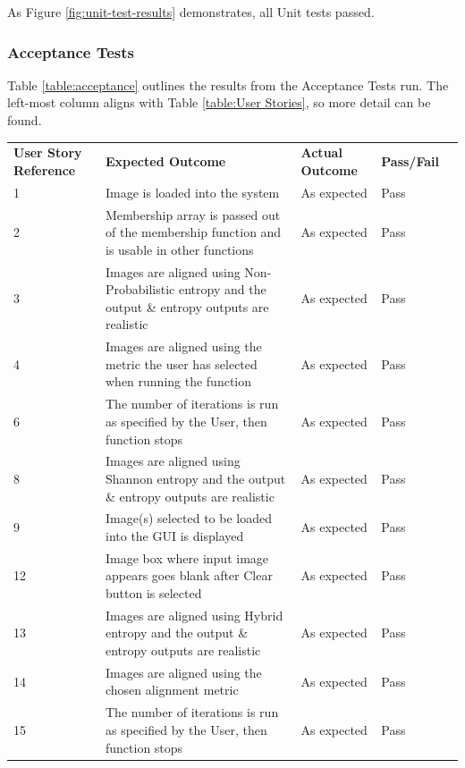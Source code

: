As Figure \ref{fig:unit-test-results} demonstrates, all Unit tests passed.

\subsubsection{Acceptance Tests}

Table \ref{table:acceptance} outlines the results from the Acceptance Tests run. The left-most column  aligns with Table \ref{table:User Stories}, so more detail can be found.

\begin{center}
  \small
  \begin{longtable}{| p{3cm} | p{4cm} | p{4cm}  | p{3cm} | p{2cm} |}
    \hline
      \textbf{User Story Reference} & \textbf{Expected Outcome} & \textbf{Actual Outcome} & \textbf{Pass/Fail} \\
      1 & Image is loaded into the system & As expected & Pass \\ \hline
      2 & Membership array is passed out of the membership function and is usable in other functions & As expected & Pass \\ \hline
      3 & Images are aligned using Non-Probabilistic entropy and the output \& entropy outputs are realistic & As expected & Pass \\ \hline
      4 & Images are aligned using the metric the user has selected when running the function & As expected & Pass \\ \hline
      6 & The number of iterations is run as specified by the User, then function stops & As expected & Pass \\ \hline
      8 & Images are aligned using Shannon entropy and the output \& entropy outputs are realistic & As expected & Pass \\ \hline
      9 & Image(s) selected to be loaded into the GUI is displayed & As expected & Pass \\ \hline
      12 & Image box where input image appears goes blank after Clear button is selected & As expected & Pass \\ \hline
      13 & Images are aligned using Hybrid entropy and the output \& entropy outputs are realistic & As expected & Pass \\ \hline
      14 & Images are aligned using the chosen alignment metric & As expected & Pass \\ \hline
      15 & The number of iterations is run as specified by the User, then function stops & As expected & Pass \\ \hline

\end{longtable}
\end{center}
